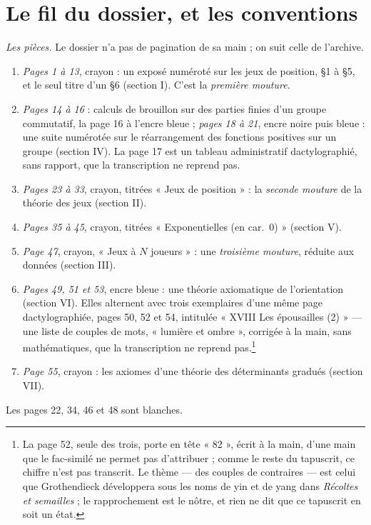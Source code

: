 \documentclass[11pt,a4paper]{article}
\begin{document}
\section*{Le fil du dossier, et les conventions}

\emph{Les pièces.} Le dossier n'a pas de pagination de sa main ; on suit
celle de l'archive.

\begin{enumerate}
  \item \emph{Pages 1 à 13}, crayon : un exposé numéroté sur les jeux de
  position, §1 à §5, et le seul titre d'un §6 (section I). C'est la
  \emph{première mouture}.
  \item \emph{Pages 14 à 16} : calculs de brouillon sur des parties finies
  d'un groupe commutatif, la page 16 à l'encre bleue ; \emph{pages 18 à 21},
  encre noire puis bleue : une suite numérotée sur le réarrangement des
  fonctions positives sur un groupe (section IV). La page 17 est un tableau
  administratif dactylographié, sans rapport, que la transcription ne reprend
  pas.
  \item \emph{Pages 23 à 33}, crayon, titrées « Jeux de position » : la
  \emph{seconde mouture} de la théorie des jeux (section II).
  \item \emph{Pages 35 à 45}, crayon, titrées « Exponentielles (en car.\ 0) »
  (section V).
  \item \emph{Page 47}, crayon, « Jeux à $N$ joueurs » : une \emph{troisième
  mouture}, réduite aux données (section III).
  \item \emph{Pages 49, 51 et 53}, encre bleue : une théorie axiomatique de
  l'orientation (section VI). Elles alternent avec trois exemplaires d'une
  même page dactylographiée, pages 50, 52 et 54, intitulée « XVIII Les
  épousailles (2) » --- une liste de couples de mots, « lumière et ombre »,
  corrigée à la main, sans mathématiques, que la transcription ne reprend
  pas.\footnote{La page 52, seule des trois, porte en tête « 82 », écrit à la
  main, d'une main que le fac-similé ne permet pas d'attribuer ; comme le
  reste du tapuscrit, ce chiffre n'est pas transcrit. Le thème --- des couples
  de contraires --- est celui que Grothendieck développera sous les noms de
  yin et de yang dans \emph{Récoltes et semailles} ; le rapprochement est le
  nôtre, et rien ne dit que ce tapuscrit en soit un état.}
  \item \emph{Page 55}, crayon : les axiomes d'une théorie des déterminants
  gradués (section VII).
\end{enumerate}
Les pages 22, 34, 46 et 48 sont blanches.
\end{document}
